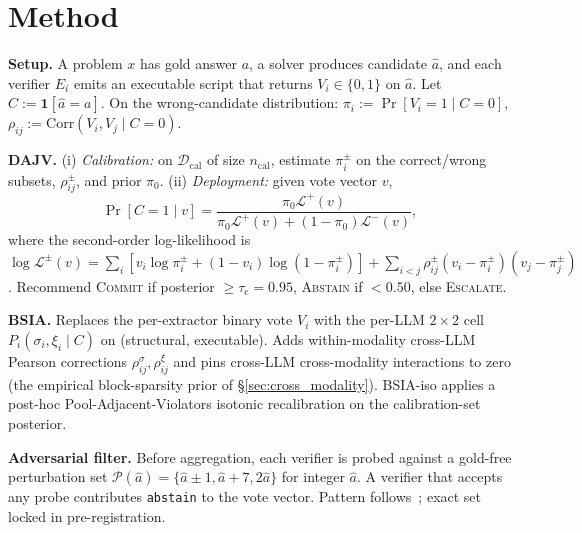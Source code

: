 \section{Method}
\label{sec:method}

\textbf{Setup.} A problem $x$ has gold answer $a$, a solver
produces candidate $\hat a$, and each verifier $E_i$ emits an
executable script that returns $V_i \in \{0, 1\}$ on $\hat a$. Let
$C := \mathbf{1}[\hat a = a]$. On the wrong-candidate distribution:
$\pi_i := \Pr[V_i = 1 \mid C = 0]$,
$\rho_{ij} := \mathrm{Corr}(V_i, V_j \mid C = 0)$.

\textbf{DAJV.} (i) \emph{Calibration:} on
$\mathcal{D}_{\text{cal}}$ of size $n_{\text{cal}}$, estimate
$\pi^{\pm}_i$ on the correct/wrong subsets,
$\rho^{\pm}_{ij}$, and prior $\pi_0$.
(ii) \emph{Deployment:} given vote vector $v$,
\begin{equation}
  \Pr[C = 1 \mid v] = \frac{\pi_0 \mathcal{L}^+(v)}{\pi_0 \mathcal{L}^+(v) + (1-\pi_0)\mathcal{L}^-(v)},
  \label{eq:posterior}
\end{equation}
where the second-order log-likelihood is
$\log \mathcal{L}^\pm(v) = \sum_i [v_i \log \pi^\pm_i +
(1{-}v_i)\log(1{-}\pi^\pm_i)] + \sum_{i<j} \rho^\pm_{ij}
(v_i - \pi^\pm_i)(v_j - \pi^\pm_j)$.
Recommend \textsc{Commit} if posterior $\geq \tau_{\text{c}} = 0.95$,
\textsc{Abstain} if $< 0.50$, else \textsc{Escalate}.

\textbf{BSIA.} Replaces the per-extractor binary vote $V_i$ with the
per-LLM $2 \!\times\! 2$ cell
$P_i(\sigma_i, \xi_i \mid C)$ on (structural, executable). Adds
within-modality cross-LLM Pearson corrections
$\rho^\sigma_{ij}, \rho^\xi_{ij}$ and pins cross-LLM cross-modality
interactions to zero (the empirical block-sparsity prior of
\S\ref{sec:cross_modality}). BSIA-iso applies a post-hoc
Pool-Adjacent-Violators isotonic recalibration on the
calibration-set posterior.

\textbf{Adversarial filter.} Before aggregation, each verifier is
probed against a gold-free perturbation set
$\mathcal{P}(\hat a) = \{\hat a \pm 1, \hat a + 7, 2\hat a\}$ for
integer $\hat a$. A verifier that accepts any probe contributes
\texttt{abstain} to the vote vector. Pattern
follows~\citep{dtv2024,bagheriNezhad2025symcode}; exact set locked
in pre-registration.
